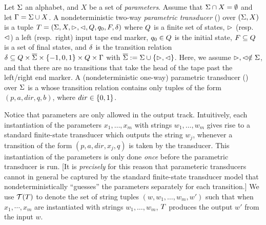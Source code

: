 \begin{definition}
    Let $\Sigma$ an alphabet, and $X$ be a set of \emph{parameters}. 
    Assume that $\Sigma \cap X = \emptyset$ and let $\Gamma = 
    \Sigma \cup X$.
    A nondeterministic two-way \emph{parametric transducer} (\PPT) over 
    $(\Sigma,X)$ is a tuple $T =
(\Sigma, X, \vartriangleright, \vartriangleleft, Q, q_0, F, \delta)$ where 
    $Q$ is a finite set of 
    states, $\vartriangleright$ (resp.~$\vartriangleleft$) a left (resp.~right) input tape end 
    marker, $q_0\in Q$ is
the initial state, $F\subseteq Q$ is a set of final states, and 
    $\delta$ is the
transition relation  $\delta\subseteq Q \times 
    \overline{\Sigma}\times \{-1, 0, 1\}\times 
    Q \times \Gamma$ with
    $\overline{\Sigma} := \Sigma \cup \{\vartriangleright,\vartriangleleft\}$.
    Here, we assume $\vartriangleright, \vartriangleleft \notin \Sigma$, and that
    there are no transitions that take the head of the tape past the left/right
    end marker. 
    A (nondeterministic one-way) parametric transducer (\PT) over
    $\Sigma$
    is a \PPT{} whose transition relation contains only tuples of the form
    $(p,a,dir,q,b)$, where $dir \in \{0,1\}$.
\end{definition}

Notice that parameters are only allowed in the output track.
Intuitively, each instantiation of the parameters $x_1,\ldots,x_m$ with strings 
$w_1,\ldots, w_m$ gives rise to a standard finite-state transducer which outputs
the string $w_j$, whenever a transition of the form $(p, a, dir, x_j, q)$ is
taken by the transducer. This instantiation of the parameters is only done 
\emph{once} before the parametric transducer is run. [It is \emph{precisely}
for this reason that parameteric transducers cannot in general be captured by 
the standard finite-state transducer model that nondeterministically ``guesses''
the parameters separately for each transition.]  We use $\mathcal{T}(T)$ to denote the set of string tuples $(w, w_1, \ldots, w_m, w')$ such that when $x_1,\cdots, x_m$ are instantiated with strings $w_1,\ldots, w_m$, $T$ produces the output $w'$ from the input $w$. 



